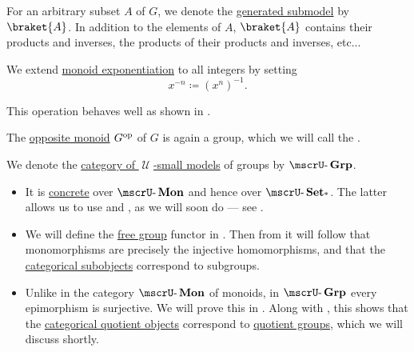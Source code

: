 \begin{definition}
\begin{thmenum}
    For an arbitrary subset \( A \) of \( G \), we denote the \hyperref[def:first_order_generated_substructure]{generated submodel} by \( \braket{ A } \). In addition to the elements of \( A \), \( \braket{ A } \) contains their products and inverses, the products of their products and inverses, etc...

     We extend \hyperref[def:monoid/exponentiation]{monoid exponentiation} to all integers by setting
    \begin{equation*}
      x^{-n} \coloneqq (x^n)^{-1}.
    \end{equation*}

    This operation behaves well as shown in .

     The \hyperref[def:monoid/opposite]{opposite monoid} \( G^{\operatorname{op}} \) of \( G \) is again a group, which we will call the .

     We denote the \hyperref[def:category_of_small_first_order_models]{category of \( \mscrU \)-small models} of groups by \( \ucat{Grp} \).

    \begin{itemize}
      \item It is \hyperref[def:concrete_category]{concrete} over \hyperref[def:monoid/category]{\( \ucat{Mon} \)} and hence over \hyperref[def:pointed_set/category]{\( \ucat{Set_*} \)}. The latter allows us to use  and , as we will soon do --- see .

      \item We will define the \hyperref[def:free_group]{free group} functor in . Then from  it will follow that monomorphisms are precisely the injective homomorphisms, and that the \hyperref[def:subobject_and_quotient]{categorical subobjects} correspond to subgroups.

      \item Unlike in the category \hyperref[def:monoid/category]{\( \ucat{Mon} \)} of monoids, in \( \ucat{Grp} \) every epimorphism is surjective. We will prove this in . Along with , this shows that the \hyperref[def:subobject_and_quotient]{categorical quotient objects} correspond to \hyperref[def:group/quotient]{quotient groups}, which we will discuss shortly.


\end{itemize}
\end{thmenum}
\end{definition}
